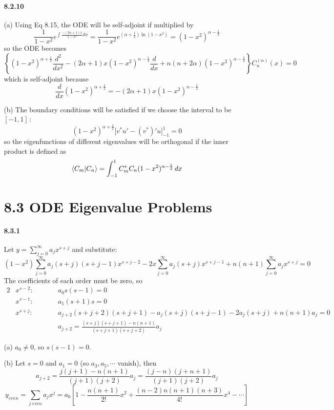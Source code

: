 \documentclass[a4paper]{article}
\begin{document}
\paragraph{8.2.10}
(a)
Using Eq 8.15, the ODE will be self-adjoint if multiplied by
\[
\frac{1}{1-x^2}e^{\int\frac{-(2\alpha
+1)x}{1-x^2}dx}=\frac{1}{1-x^2}e^{(\alpha+\frac{1}{2})\ln(1-x^2)}=(1-x^2)^{\alpha-\frac{1}{2}}
\]
so the ODE becomes
\[
\left\{(1-x^2)^{\alpha+\frac{1}{2}}\frac{d^2}{dx^2}-(2\alpha+1)x(1-x^2)^{\alpha-\frac{1}{2}}\frac{d}{dx}+n(n+2\alpha)(1-x^2)^{\alpha-\frac{1}{2}} \right\}C_n^{(\alpha)}(x)=0
\]
which is self-adjoint because 
\[
\frac{d}{dx}(1-x^2)^{\alpha+\frac{1}{2}}=-(2\alpha+1)x(1-x^2)^{\alpha-\frac{1}{2}}
\]

(b)
The boundary conditions will be satisfied if we choose the interval to be $[-1,1]$\,:
\[
(1-x^2)^{\alpha+\frac{1}{2}}\big[v^*u'-(v^*)'u \big]_{-1}^1=0
\]
so the eigenfunctions of different eigenvalues will be orthogonal if the inner product is defined as
\[
\langle C_m|C_n\rangle=\int_{-1}^1C_m^*C_n(1-x^2)^{\alpha-\frac{1}{2}}\,dx
\]

\section*{8.3 ODE Eigenvalue Problems}

\paragraph{8.3.1}
Let $y=\sum_{j=0}^\infty a_jx^{s+j}$ and substitute:
\[
(1-x^2)\sum_{j=0}^\infty a_j(s+j)(s+j-1)x^{s+j-2}-2x\sum_{j=0}^\infty a_j(s+j)x^{s+j-1}+n(n+1)\sum_{j=0}^\infty a_j x^{s+j}=0
\]
The coefficients of each order must be zero, so
\begin{alignat*}{2}
    & x^{s-2}:\qquad && a_0s(s-1)=0\\
    & x^{s-1}:\qquad && a_1(s+1)s=0\\
    & x^{s+j}:\qquad && a_{j+2}(s+j+2)(s+j+1)-a_j(s+j)(s+j-1)-2a_j(s+j)+n(n+1)a_j=0\\
    & && a_{j+2}=\frac{(s+j)(s+j+1)-n(n+1)}{(s+j+1)(s+j+2)}a_j
\end{alignat*}

(a)
$a_0\neq0$, so $s(s-1)=0$.
\medskip

(b)
Let $s=0$ and $a_1=0$ (so $a_3,a_5,\cdots$ vanish), then 
\[
a_{j+2}=\frac{j(j+1)-n(n+1)}{(j+1)(j+2)}a_j=\frac{(j-n)(j+n+1)}{(j+1)(j+2)}a_j
\]
\[
y_{even}=\sum_{j\; even}a_jx^j=a_0\left[1-\frac{n(n+1)}{2!}x^2+\frac{(n-2)n(n+1)(n+3)}{4!}x^4-\cdots \right]
\]
\end{document}
